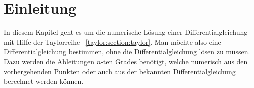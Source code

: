 %
%
%
\section{Einleitung
\label{taylor:section:einleitung}}
In diesem Kapitel geht es um die numerische Lösung einer Differentialgleichung mit Hilfe der Taylorreihe ~\ref{taylor:section:taylor}.
Man möchte also eine Differentialgleichung bestimmen, ohne die Differentialgleichung lösen zu müssen.
Dazu werden die Ableitungen $n$-ten Grades benötigt, welche numerisch aus den vorhergehenden Punkten oder auch aus der bekannten Differentialgleichung berechnet werden können.

